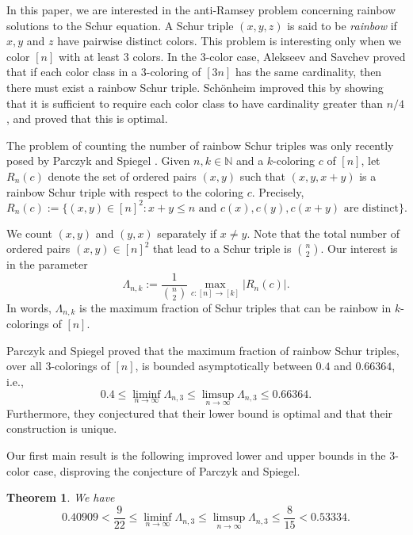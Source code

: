 \documentclass[11pt]{article}
\theoremstyle{plain}
\newtheorem{theorem}{Theorem}[section]
\numberwithin{equation}{section}
\begin{document}
In this paper, we are interested in the anti-Ramsey problem concerning rainbow solutions to the Schur equation. A Schur triple $(x,y,z)$ is said to be \emph{rainbow} if $x, y$ and $z$ have pairwise distinct colors. This problem is interesting only when we color $[n]$ with at least 3 colors. In the 3-color case, Alekseev and Savchev \cite{alekseev1987problem} proved that if each color class in a $3$-coloring of $[3n]$ has the same cardinality, then there must exist a rainbow Schur triple. Sch\"{o}nheim \cite{Schonheim_1990} improved this by showing that it is sufficient to require each color class to have cardinality greater than $n/4$, and proved that this is optimal. 

The problem of counting the number of rainbow Schur triples was only recently posed by Parczyk and Spiegel \cite{Parczyk_Spiegel_2026}. Given $n, k\in \mathbb{N}$ and a $k$-coloring $c$ of $[n]$, let $R_n(c)$ denote the set of ordered pairs $(x,y)$ such that $(x,y,x+y)$ is a rainbow Schur triple with respect to the coloring $c$. Precisely,
\begin{equation}\label{eq:Schur_pairs}
R_n(c):=\{(x,y)\in [n]^2: x+y\le n \text{ and }c(x), c(y), c(x+y) \text{ are distinct} \}.
\end{equation}
 
We count $(x,y)$ and $(y,x)$ separately if $x\ne y$. Note that the total number of ordered pairs $(x,y)\in [n]^2$ that lead to a Schur triple is $n\choose 2$. Our interest is in the parameter
\[ \Lambda_{n,k}:=\frac{1}{{n\choose 2}}\max_{c:[n]\to [k]} |R_n(c)|.\]
In words, $\Lambda_{n,k}$ is the maximum fraction of Schur triples that can be rainbow in $k$-colorings of $[n]$. 

Parczyk and Spiegel \cite{Parczyk_Spiegel_2026} proved that the maximum fraction of rainbow Schur triples, over all $3$-colorings of $[n]$, is bounded asymptotically between $0.4$ and $0.66364$, i.e.,
 \[ 0.4\le \liminf_{n\to \infty} \Lambda_{n,3}\le  \limsup_{n\to \infty} \Lambda_{n,3} \le 0.66364.\]
Furthermore, they conjectured that their lower bound is optimal and that their construction is unique.

Our first main result is the following improved lower and upper bounds in the $3$-color case, disproving the conjecture of Parczyk and Spiegel.

\begin{theorem}\label{thm:lower_upper_bound_3_color} We have  
 \[ 0.40909< \frac{9}{22}\le \liminf_{n\to \infty} \Lambda_{n,3}\le  \limsup_{n\to \infty} \Lambda_{n,3} \le \frac{8}{15}< 0.53334.\]
\end{theorem}
\end{document}
